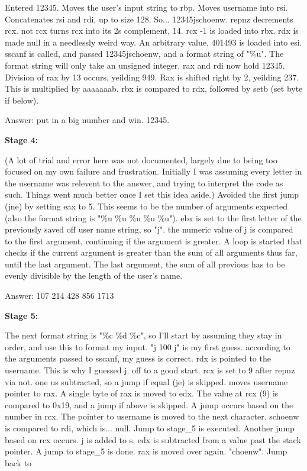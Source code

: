 \documentclass{article}
\begin{document}
    \bigskip

    Entered 12345.
    Moves the user's input string to rbp. Moves username into rsi. Concatenates rsi and rdi, up to size 128. So... 12345jschoenw.
    repnz decrements rcx. not rcx turns rcx into its 2s complement, 14.
    rcx -1 is loaded into rbx. rdx is made null in a needlessly weird way.
    An arbitrary value, 401493 is loaded into esi.
    sscanf is called, and passed 12345jschoenw, and a format string of "\%u".
    The format string will only take an unsigned integer.
    rax and rdi now hold 12345.
    Division of rax by 13 occurs, yeilding 949.
    Rax is shifted right by 2, yeilding 237.
    This is multiplied by aaaaaaab.
    rbx is compared to rdx, followed by setb (set byte if below).

    \bigskip

    Answer: put in a big number and win. 12345.

    \bigskip

    \textbf{Stage 4:}

    \bigskip

    (A lot of trial and error here was not documented, largely due to being too focused on my own failure and frustration. Initially I was assuming every letter in the username was relevent to the answer, and trying to interpret the code as such. Things went much better once I set this idea aside.)
    Avoided the first jump (jne) by setting eax to 5. This seems to be the number of arguments expected (also the format string is "\%u \%u \%u \%u \%u"). ebx is set to the first letter of the previously saved off user name string, so "j". the numeric value of j is compared to the first argument, continuing if the argument is greater. A loop is started that checks if the current argument is greater than the sum of all arguments thus far, until the last argument.
    The last argument, the sum of all previous\+ has to be evenly divisible by the length of the user's name.

    \bigskip

    Answer: 107 214 428 856 1713

    \bigskip

    \textbf{Stage 5:}

    \bigskip

    The next format string is "\%c \%d \%c", so I'll start by assuming they stay in order, and use this to format my input.
    "j 100 j" is my first guess.
    according to the arguments passed to sscanf, my guess is correct.
    rdx is pointed to the username. This is why I guessed j. off to a good start.
    rcx is set to 9 after repnz via not.
    one us subtracted, so a jump if equal (je) is skipped.
    moves username pointer to rax.
    A single byte of rax is moved to edx.
    The value at rcx (9) is compared to 0x19, and a jump if above is skipped.
    A jump occurs based on the number in rcx.
    The pointer to username is moved to the next character.
    schoenw is compared to rdi, which is... null.
    Jump to stage\_5 is executed.
    Another jump based on rcx occurs.
    j is added to s.
    edx is subtracted from a value past the stack pointer.
    A jump to stage\_5 is done.
    rax is moved over again. "choenw".
    Jump back to 
    
\end{document}
